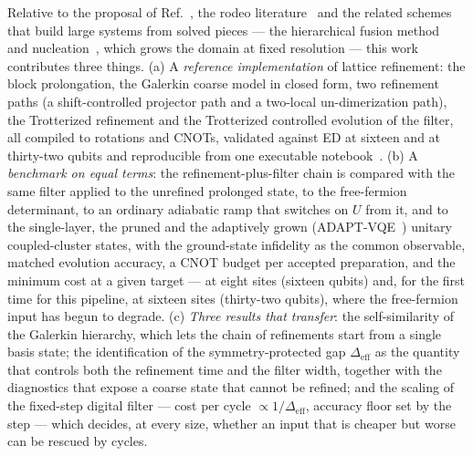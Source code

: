\documentclass[a4paper,11pt,noarxiv]{quantumarticle}
\newcommand{\Deff}{\Delta_{\mathrm{eff}}}
\begin{document}
Relative to the proposal of Ref.~\cite{Bogner2026}, the rodeo
literature~\cite{Choi2021,Qian2024,Cohen2023,BeeLindgren2022} and the related
schemes that build large systems from solved pieces --- the hierarchical
fusion method~\cite{Patkowski2025fusion} and
nucleation~\cite{Sadia2026}, which grows the domain at fixed resolution ---
this work contributes three things.  (a) A \emph{reference implementation}
of lattice refinement: the block prolongation, the Galerkin coarse model in
closed form, two refinement paths (a shift-controlled projector path and a
two-local un-dimerization path), the Trotterized refinement and the
Trotterized controlled evolution of the filter, all compiled to rotations
and CNOTs, validated against ED at sixteen and at thirty-two qubits and
reproducible from one executable notebook~\cite{Code}.  (b) A
\emph{benchmark on equal terms}: the refinement-plus-filter chain is
compared with the same filter applied to the unrefined prolonged state, to
the free-fermion determinant, to an ordinary adiabatic ramp that switches
on $U$ from it, and to the single-layer, the pruned and the adaptively grown
(ADAPT-VQE~\cite{Grimsley2019}) unitary coupled-cluster states, with the
ground-state infidelity as the common observable, matched evolution
accuracy, a CNOT budget per accepted preparation, and the minimum cost at a
given target --- at eight sites (sixteen qubits) and, for the first time for
this pipeline, at sixteen sites (thirty-two qubits), where the free-fermion
input has begun to degrade.  (c) \emph{Three results that transfer}: the
self-similarity of the Galerkin hierarchy, which lets the chain of
refinements start from a single basis state; the identification of the
symmetry-protected gap $\Deff$ as the quantity that controls both the
refinement time and the filter width, together with the diagnostics that
expose a coarse state that cannot be refined; and the scaling of the
fixed-step digital filter --- cost per cycle $\propto1/\Deff$, accuracy floor
set by the step --- which decides, at every size, whether an input that is
cheaper but worse can be rescued by cycles.
\end{document}
